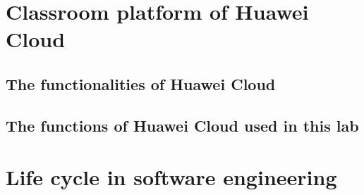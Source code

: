 \documentclass[a4paper]{report}
\begin{document}
\section{Classroom platform of Huawei Cloud}
\subsection{The functionalities of Huawei Cloud}

\subsection{The functions of Huawei Cloud used in this lab}
\section{Life cycle in software engineering}
\end{document}
